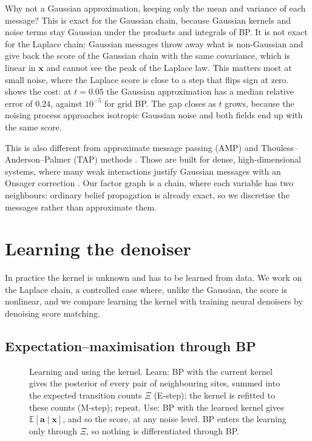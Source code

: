 \documentclass{article}
\begin{document}
Why not a Gaussian approximation, keeping only the mean and variance of each message? This is exact for the Gaussian
chain, because Gaussian kernels and noise terms stay Gaussian under the products and integrals of BP. It is not exact
for the Laplace chain: Gaussian messages throw away what is non-Gaussian and give back the score of the Gaussian chain
with the same covariance, which is linear in $\mathbf x$ and cannot see the peak of the Laplace law. This matters most at
small noise, where the Laplace score is close to a step that flips sign at zero.  shows the
cost: at $t=0.05$ the Gaussian approximation has a median relative error of $0.24$, against $10^{-5}$ for grid BP. The
gap closes as $t$ grows, because the noising process approaches isotropic Gaussian noise and both fields end up with the
same score.

This is also different from approximate message passing (AMP) and Thouless--Anderson--Palmer (TAP) methods
\cite{thouless1977solution,mezard1986sk,kabashima2003cdma,donoho2009message,krzakala2012statistical,bolthausen2014iterative}.
Those are built for dense, high-dimensional systems, where many weak interactions justify Gaussian messages with an
Onsager correction \cite{zdeborova2016statistical,mezard2017meanfield,lauditi2023sparse}. Our factor graph is a chain,
where each variable has two neighbours: ordinary belief propagation is already exact, so we discretise the messages
rather than approximate them.

\section{Learning the denoiser}
\label{sec:learning}

In practice the kernel is unknown and has to be learned from data. We work on the Laplace chain, a controlled case where,
unlike the Gaussian, the score is nonlinear, and we compare learning the kernel with training neural denoisers by
denoising score matching.

\subsection{Expectation--maximisation through BP}
\label{sec:em}

\begin{figure}[t]
  \centering
  
  \caption{Learning and using the kernel. Learn: BP with the current kernel gives the posterior of every pair of
  neighbouring sites, summed into the expected transition counts $\Xi$ (E-step); the kernel is refitted to these
  counts (M-step); repeat. Use: BP with the learned kernel gives $\mathbb E[\mathbf a\mid\mathbf x]$, and so the score,
  at any noise level. BP enters the learning only through $\Xi$, so nothing is differentiated through BP.}
  \label{fig:em-loop}
\end{figure}
\end{document}
